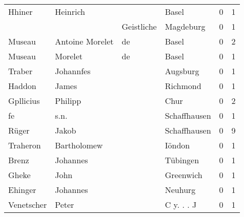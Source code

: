 \begin{tabular}{llllrr}
                   Hhiner &                           Heinrich &             &                                       Basel &          0 &         1 \\
                          &                                    &  Geistliche &                                   Magdeburg &          0 &         1 \\
                   Museau &                    Antoine Morelet &          de &                                       Basel &          0 &         2 \\
                   Museau &                            Morelet &          de &                                       Basel &          0 &         1 \\
                   Traber &                          Johannfes &             &                                    Augsburg &          0 &         1 \\
                   Haddon &                              James &             &                                    Richmond &          0 &         1 \\
                Gpllicius &                            Philipp &             &                                        Chur &          0 &         2 \\
                       fe &                               s.n. &             &                                Schaffhausen &          0 &         1 \\
                    Rüger &                              Jakob &             &                                Schaffhausen &          0 &         9 \\
                 Traheron &                        Bartholomew &             &                                      Iöndon &          0 &         1 \\
                    Brenz &                           Johannes &             &                                    Tübingen &          0 &         1 \\
                    Gheke &                               John &             &                                   Greenwich &          0 &         1 \\
                  Ehinger &                           Johannes &             &                                     Neuhurg &          0 &         1 \\
               Venetscher &                              Peter &             &                                  C y. . . J &          0 &         1 \\

\end{tabular}
